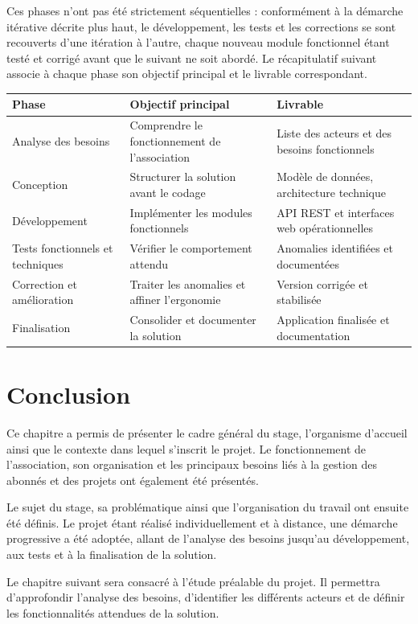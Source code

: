 Ces phases n'ont pas été strictement séquentielles : conformément à la démarche itérative décrite plus haut, le développement, les tests et les corrections se sont recouverts d'une itération à l'autre, chaque nouveau module fonctionnel étant testé et corrigé avant que le suivant ne soit abordé. Le récapitulatif suivant associe à chaque phase son objectif principal et le livrable correspondant.

\begin{center}
\small
\begin{tabular}{@{}p{3.6cm}p{4.6cm}p{5.2cm}@{}}
\toprule
\textbf{Phase} & \textbf{Objectif principal} & \textbf{Livrable} \\
\midrule
Analyse des besoins & Comprendre le fonctionnement de l'association & Liste des acteurs et des besoins fonctionnels \\
\addlinespace[2pt]
Conception & Structurer la solution avant le codage & Modèle de données, architecture technique \\
\addlinespace[2pt]
Développement & Implémenter les modules fonctionnels & API REST et interfaces web opérationnelles \\
\addlinespace[2pt]
Tests fonctionnels et techniques & Vérifier le comportement attendu & Anomalies identifiées et documentées \\
\addlinespace[2pt]
Correction et amélioration & Traiter les anomalies et affiner l'ergonomie & Version corrigée et stabilisée \\
\addlinespace[2pt]
Finalisation & Consolider et documenter la solution & Application finalisée et documentation \\
\bottomrule
\end{tabular}
\end{center}

\section{Conclusion}

Ce chapitre a permis de présenter le cadre général du stage, l'organisme d'accueil ainsi que le contexte dans lequel s'inscrit le projet. Le fonctionnement de l'association, son organisation et les principaux besoins liés à la gestion des abonnés et des projets ont également été présentés.

Le sujet du stage, sa problématique ainsi que l'organisation du travail ont ensuite été définis. Le projet étant réalisé individuellement et à distance, une démarche progressive a été adoptée, allant de l'analyse des besoins jusqu'au développement, aux tests et à la finalisation de la solution.

Le chapitre suivant sera consacré à l'étude préalable du projet. Il permettra d'approfondir l'analyse des besoins, d'identifier les différents acteurs et de définir les fonctionnalités attendues de la solution.